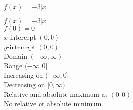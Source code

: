 {$f(x) = -3|x|$}
{$f(x) = -3|x|$ \\ $f(0) = 0$ \\ $x$-intercept $(0, 0)$ \\ $y$-intercept $(0, 0)$ \\ Domain $(-\infty, \infty)$ \\ Range $(-\infty, 0]$ \\ Increasing on $(-\infty, 0]$ \\ Decreasing on $[0, \infty)$ \\ Relative and absolute maximum at $(0, 0)$ \\ No relative or absolute minimum 

\begin{center}
\end{center}}